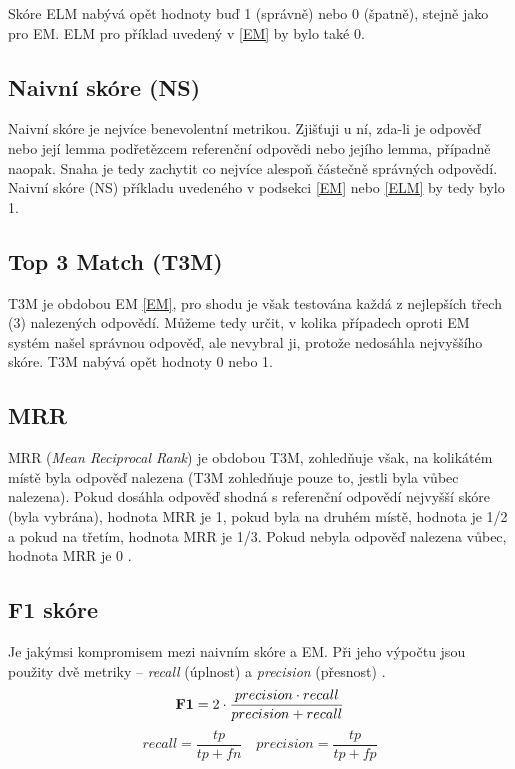 Skóre ELM nabývá opět hodnoty buď 1 (správně) nebo 0 (špatně), stejně jako pro EM. ELM pro příklad uvedený v \ref{EM} by bylo také 0.

\subsection{Naivní skóre (NS)}
Naivní skóre je nejvíce benevolentní metrikou. Zjišťuji u ní, zda-li je odpověď nebo její lemma podřetězcem referenční odpovědi nebo jejího lemma, případně naopak. Snaha je tedy zachytit co nejvíce alespoň částečně správných odpovědí. Naivní skóre (NS) příkladu uvedeného v podsekci \ref{EM} nebo \ref{ELM} by tedy bylo 1. 

\subsection{Top 3 Match (T3M)}
T3M je obdobou EM \ref{EM}, pro shodu je však testována každá z nejlepších třech (3) nalezených odpovědí. Můžeme tedy určit, v kolika případech oproti EM systém našel správnou odpověď, ale nevybral ji, protože nedosáhla nejvyššího skóre. T3M nabývá opět hodnoty 0 nebo 1.

\subsection{MRR}
MRR (\emph{Mean Reciprocal Rank}) je obdobou T3M, zohledňuje však, na kolikátém místě byla odpověď nalezena (T3M zohledňuje pouze to, jestli byla vůbec nalezena). Pokud dosáhla odpověď shodná s referenční odpovědí nejvyšší skóre (byla vybrána), hodnota MRR je 1, pokud byla na druhém místě, hodnota je 1/2 a pokud na třetím, hodnota MRR je 1/3. Pokud nebyla odpověď nalezena vůbec, hodnota MRR je 0 \cite{MRR}.

\subsection{F1 skóre}
Je jakýmsi kompromisem mezi naivním skóre a EM. Při jeho výpočtu jsou použity dvě metriky -- \emph{recall} (úplnost) a \emph{precision} (přesnost) \cite{information_retrieval}.
\begin{equation}
    \text{\textbf{F1}} = 2\cdot \frac{precision \cdot recall}{precision + recall} 
\end{equation}
\begin{equation}
recall = \frac{tp}{tp+fn} \quad precision = \frac{tp}{tp+fp}
\end{equation}

